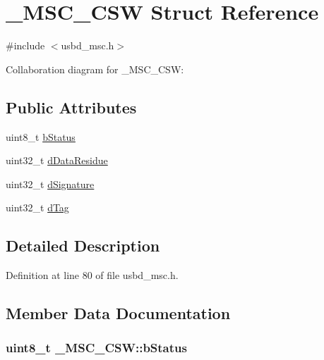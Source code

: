 \hypertarget{struct__MSC__CSW}{}\section{\+\_\+\+M\+S\+C\+\_\+\+C\+SW Struct Reference}
\label{struct__MSC__CSW}


{\ttfamily \#include $<$usbd\+\_\+msc.\+h$>$}



Collaboration diagram for \+\_\+\+M\+S\+C\+\_\+\+C\+SW\+:
\subsection*{Public Attributes}
\begin{DoxyCompactItemize}
\item 
uint8\+\_\+t \hyperlink{struct__MSC__CSW_a6dc520801824afdf286135b22366cbbe}{b\+Status}
\item 
uint32\+\_\+t \hyperlink{struct__MSC__CSW_a58a9d983a1e1707b9a99ad1a61acae72}{d\+Data\+Residue}
\item 
uint32\+\_\+t \hyperlink{struct__MSC__CSW_ab5e9fc6fcc75f4b6e5ca7aada1443913}{d\+Signature}
\item 
uint32\+\_\+t \hyperlink{struct__MSC__CSW_a6b340e8049b2f6b06d3747b42db1ebac}{d\+Tag}
\end{DoxyCompactItemize}


\subsection{Detailed Description}


Definition at line 80 of file usbd\+\_\+msc.\+h.



\subsection{Member Data Documentation}
\subsubsection[{\texorpdfstring{b\+Status}{bStatus}}]{\setlength{\rightskip}{0pt plus 5cm}uint8\+\_\+t \+\_\+\+M\+S\+C\+\_\+\+C\+S\+W\+::b\+Status}\hypertarget{struct__MSC__CSW_a6dc520801824afdf286135b22366cbbe}{}\label{struct__MSC__CSW_a6dc520801824afdf286135b22366cbbe}


